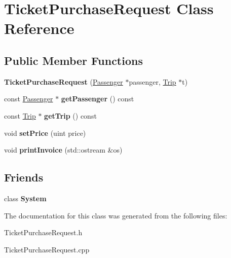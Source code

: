 \hypertarget{classTicketPurchaseRequest}{}\section{Ticket\+Purchase\+Request Class Reference}
\label{classTicketPurchaseRequest}
\subsection*{Public Member Functions}
\begin{DoxyCompactItemize}
\item 
\mbox{\label{classTicketPurchaseRequest_aaa01be19b8a8ef88428f4d1dc3a3c63c}} 
{\bfseries Ticket\+Purchase\+Request} (\mbox{\hyperlink{classPassenger}{Passenger}} $\ast$passenger, \mbox{\hyperlink{classTrip}{Trip}} $\ast$t)
\item 
\mbox{\label{classTicketPurchaseRequest_a08428a7617aa26c16702420e61ce0312}} 
const \mbox{\hyperlink{classPassenger}{Passenger}} $\ast$ {\bfseries get\+Passenger} () const
\item 
\mbox{\label{classTicketPurchaseRequest_a7ae48dcccbcddb298fae1bd74048570b}} 
const \mbox{\hyperlink{classTrip}{Trip}} $\ast$ {\bfseries get\+Trip} () const
\item 
\mbox{\label{classTicketPurchaseRequest_a289ba4fd54f5a0e5a8e8e4eecbff6b23}} 
void {\bfseries set\+Price} (uint price)
\item 
\mbox{\label{classTicketPurchaseRequest_a626107dad44c79663d318573e5c6bae2}} 
void {\bfseries print\+Invoice} (std\+::ostream \&os)
\end{DoxyCompactItemize}
\subsection*{Friends}
\begin{DoxyCompactItemize}
\item 
\mbox{\label{classTicketPurchaseRequest_af18a9ee98e70982bfe2975391d7221a5}} 
class {\bfseries System}
\end{DoxyCompactItemize}


The documentation for this class was generated from the following files\+:\begin{DoxyCompactItemize}
\item 
Ticket\+Purchase\+Request.\+h\item 
Ticket\+Purchase\+Request.\+cpp\end{DoxyCompactItemize}

